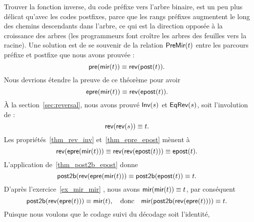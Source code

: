 Trouver la fonction inverse, du code préfixe vers l'arbre binaire, est
un peu plus délicat qu'avec les codes postfixes, parce que les rangs
préfixes augmentent le long des chemins descendants dans l'arbre, ce
qui est la direction opposée à la croissance des arbres (les
programmeurs font croître les arbres des feuilles vers la racine). Une
solution est de se souvenir de la relation
\(\textsf{PreMir}({t})\) entre les
parcours préfixe et postfixe que nous avons prouvée
:
\begin{equation*}
\abovedisplayskip=7pt
\belowdisplayskip=7pt
\fun{pre}(\fun{mir}(t)) \equiv \fun{rev}(\fun{post}(t)).
\end{equation*}
Nous devrions étendre la preuve de ce théorème pour avoir
\begin{equation}
\abovedisplayskip=7pt
\belowdisplayskip=7pt
\fun{epre}(\fun{mir}(t)) \equiv \fun{rev}(\fun{epost}(t)).
\label{thm_epre_epost}
\index{rev@\fun{rev/1}}
\end{equation}
À la section~\ref{sec:reversal}, nous avons prouvé
\(\textsf{Inv}({s})\) et
\(\textsf{EqRev}({s})\), soit
l'involution de
:
\begin{equation}
\abovedisplayskip=7pt
\belowdisplayskip=7pt
\fun{rev}(\fun{rev}(s)) \equiv t.
\label{thm_rev_inv}
\end{equation}
Les propriétés~\eqref{thm_rev_inv} et~\eqref{thm_epre_epost} mènent à
\begin{equation*}
\abovedisplayskip=7pt
\belowdisplayskip=7pt
\fun{rev}(\fun{epre}(\fun{mir}(t))) \equiv
\fun{rev}(\fun{rev}(\fun{epost}(t))) \equiv \fun{epost}(t).
\end{equation*}
L'application de~\eqref{thm_post2b_epost} donne
\begin{equation*}
\abovedisplayskip=7pt
\belowdisplayskip=7pt
\fun{post2b}(\fun{rev}(\fun{epre}(\fun{mir}(t))) \equiv
\fun{post2b}(\fun{epost}(t)) \equiv t.
\end{equation*}
D'après l'exercice~\ref{ex_mir_mir} , nous avons
\(\textsf{mir}(\textsf{mir}(t)) \equiv t\), par conséquent
\begin{equation*}
\abovedisplayskip=7pt
\belowdisplayskip=7pt
\fun{post2b}(\fun{rev}(\fun{epre}(t))) \equiv \fun{mir}(t),
\quad\text{donc}\quad
\fun{mir}(\fun{post2b}(\fun{rev}(\fun{epre}(t)))) \equiv t.
\end{equation*}
Puisque nous voulons que le codage suivi du décodage soit l'identité,
